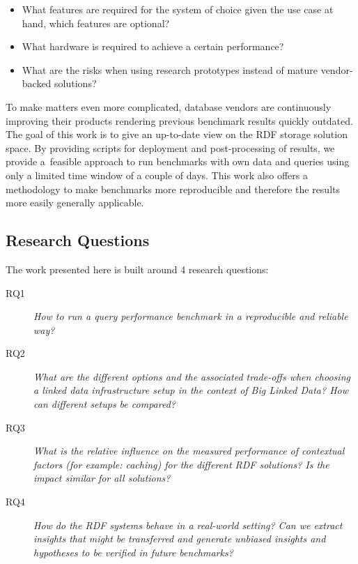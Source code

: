 \begin{itemize}
	\item What features are required for the system of choice given the use case at hand, which features are optional?
	\item What hardware is required to achieve a certain performance?
	\item What are the risks when using research prototypes instead of mature vendor-backed solutions? 
\end{itemize}

To make matters even more complicated, database vendors are continuously improving their products rendering previous benchmark results quickly outdated.
The goal of this work is to give an up-to-date view on the RDF storage solution space.
By providing scripts for deployment and post-processing of results, we provide a~feasible approach to run benchmarks with own data and queries using only a limited time window of a couple of days.
This work also offers a methodology to make benchmarks more reproducible and therefore the results more easily generally applicable.


\subsection{Research Questions}

The work presented here is built around 4 research questions:

\begin{description}
\item[RQ1] \emph{How to run a query performance benchmark in a reproducible and reliable way?}
\item[RQ2] \emph{What are the different options and the associated trade-offs when choosing a linked data infrastructure setup in the context of Big Linked Data? How can different setups be compared?}
\item[RQ3] \emph{What is the relative influence on the measured performance of contextual factors (for example: caching) for the different RDF solutions? Is the impact similar for all solutions?}
\item[RQ4] \emph{How do the RDF systems behave in a real-world setting? Can we extract insights that might be transferred and generate unbiased insights and hypotheses to be verified in future benchmarks?}
\end{description} 

